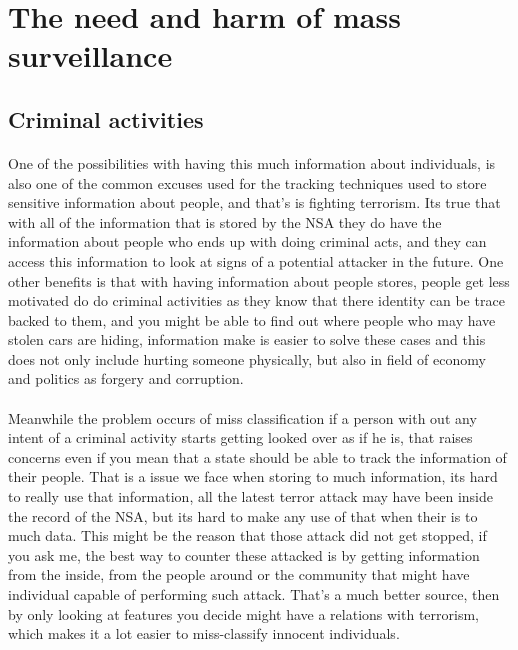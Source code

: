 \documentclass{article}
\begin{document}
\section{The need and harm of mass surveillance}
\subsection{Criminal activities}
\paragraph{}
One of the possibilities with having this much information about individuals, is also one of the common excuses used for the tracking techniques used to store sensitive information about people, and that's is fighting terrorism. Its true that with all of the information that is stored by the NSA they do have the information about people who ends up with doing criminal acts, and they can access this information to look at signs of a potential attacker in the future. One other benefits is that with having information about people stores, people get less motivated do do criminal activities as they know that there identity can be trace backed to them, and you might be able to find out where people who may have stolen cars are hiding, information make is easier to solve these cases and this does not only include hurting someone physically, but also in field of economy and politics as forgery and corruption.

\paragraph{}
Meanwhile the problem occurs of miss classification if a person with out any intent of a criminal activity starts getting looked over as if he is, that raises concerns even if you mean that a state should be able to track the information of their people. That is a issue we face when storing to much information, its hard to really use that information, all the latest terror attack may have been inside the record of the NSA, but its hard to make any use of that when their is to much data. This might be the reason that those attack did not get stopped, if you ask me, the best way to counter these attacked is by getting information from the inside, from the people around or the community that might have individual capable of performing such attack. That's a much better source, then by only looking at features you decide might have a relations with terrorism, which makes it a lot easier to miss-classify innocent individuals.
\end{document}
